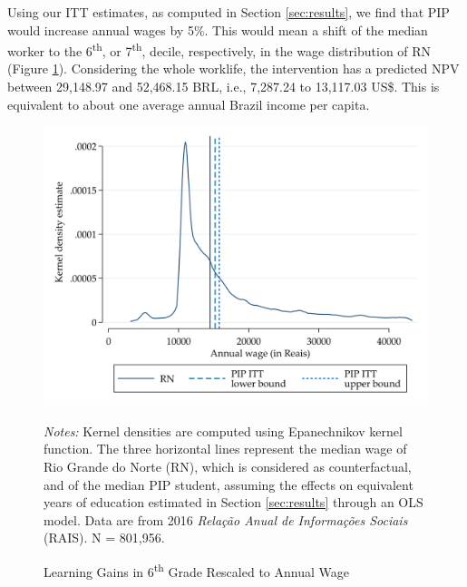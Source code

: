 \documentclass[11pt,a4paper]{article}
\begin{document}
	Using our ITT estimates, as computed in Section \ref{sec:results}, we find that PIP would increase annual wages by 5\%. This would mean a shift of the median worker to the 6\textsuperscript{th}, or 7\textsuperscript{th}, decile, respectively, in the wage distribution of RN (Figure \ref{fig:kdensity_wage}). Considering the whole worklife, the intervention has a predicted NPV between 29,148.97 and 52,468.15 BRL, i.e., 7,287.24 to 13,117.03 US\$. This is equivalent to about one average annual Brazil income per capita.
	
	\vspace{3em}
	
	\begin{figure}[ht!]
		\centering
		\caption{Learning Gains in 6\textsuperscript{th} Grade Rescaled to Annual Wage}
		\includegraphics[width=14cm]{DataWork/Output/Figures/figB1-kdensity_wage.png}
		\label{fig:kdensity_wage}
		
		\begin{minipage}{0.825\textwidth}
			\small{\textit{Notes:} Kernel densities are computed using Epanechnikov kernel function. The three horizontal lines represent the median wage of Rio Grande do Norte (RN), which is considered as counterfactual, and of the median PIP student, assuming the effects on equivalent years of education estimated in Section \ref{sec:results} through an OLS model. Data are from 2016 \textit{Relação Anual de Informações Sociais} (RAIS). N = 801,956.}
		\end{minipage}
	\end{figure}
	
	
\end{document}
